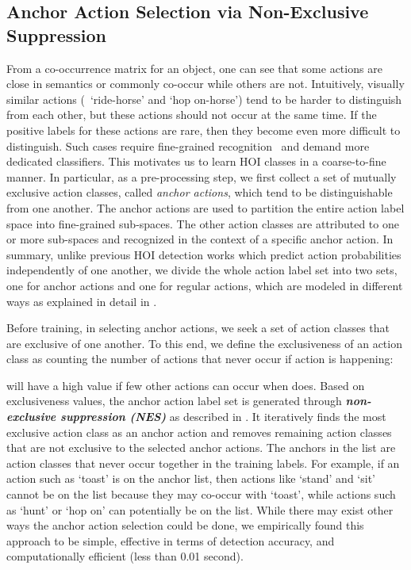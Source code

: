 \subsection{Anchor Action Selection via Non-Exclusive Suppression}
\label{sec.anchor}
{{From a co-occurrence matrix for an object, one can see that some actions are close in semantics or commonly co-occur while others are not. }}
Intuitively, 
visually similar actions (\eg~`ride-horse' and `hop on-horse')
tend to be harder to distinguish from each other, but these actions should not occur at the same time.
{If the positive labels for these actions are rare, then they become even more difficult to distinguish.}
Such cases require fine-grained recognition~\cite{fu2017look} and demand more dedicated classifiers.
This motivates us to learn HOI classes in a coarse-to-fine manner. 
In particular, as a pre-processing step, we first collect a set of mutually exclusive action {classes}, called \emph{anchor actions}, which tend to be distinguishable from one another. 
The anchor actions are used to partition the entire action {label} space into fine-grained sub-spaces. The other action {classes} are attributed to one or more sub-spaces and recognized in the context of a specific anchor action.
{In summary, unlike previous HOI detection works which predict action probabilities independently of one another, we divide the whole action label set into two sets, one for anchor actions and one for regular actions, which are modeled in different ways as explained in detail in }.








Before 
training, in selecting anchor actions, we seek a set of action {classes} that are exclusive of one another. To this end, we define the exclusiveness of an action {class} as counting the number of actions that never occur if action  is happening: 

 will have a high value if few other actions can occur when  does.
Based on exclusiveness values, the anchor action {label} set  is generated through \emph{\textbf{non-exclusive suppression (NES)}} as described in . It iteratively finds the most exclusive action {class} as an anchor action and removes remaining action {classes} that are not exclusive to the selected anchor actions. 
The anchors in the list are action {classes} that never occur together in the training labels. For example, if an action such as `toast' is on the anchor list, then actions like `stand' and `sit' cannot be on the list because they may co-occur with `toast', while actions such as `hunt' or `hop on' can potentially be on the list.
While there may exist other ways the anchor action selection could be done, we empirically found this approach to be simple, effective in terms of detection accuracy, and computationally efficient (less than 0.01 second).


